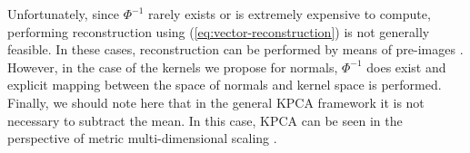 Unfortunately, since ${\Phi}^{-1}$ rarely exists or is extremely expensive to compute, performing reconstruction using (\ref{eq:vector-reconstruction}) is not generally feasible. In these cases, reconstruction can be performed by means of pre-images \cite{RefWorks:254}. However, in the case of the kernels we propose for normals, ${\Phi}^{-1}$ does exist and explicit mapping between the space of normals and kernel space is performed. Finally, we should note here that in the general KPCA framework it is not necessary to subtract the mean. In this case, KPCA can be seen in the perspective of metric multi-dimensional scaling \cite{RefWorks:253}.